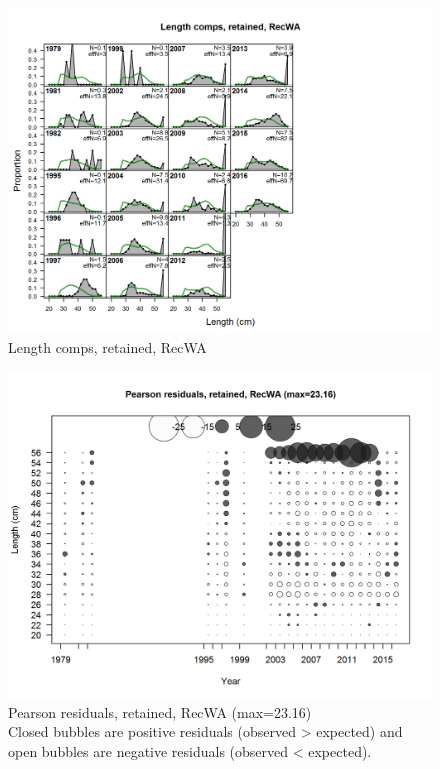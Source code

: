 \documentclass[12pt,]{article}
\begin{document}
\begin{figure}[htbp]
\centering
\includegraphics{./r4ss/plots_mod1/comp_lenfit_flt4mkt2.png}
\caption{Length comps, retained, RecWA
\label{fig:mod1_18_comp_lenfit_flt4mkt2}}
\end{figure}

\begin{figure}[htbp]
\centering
\includegraphics{./r4ss/plots_mod1/comp_lenfit_residsflt4mkt2.png}
\caption{Pearson residuals, retained, RecWA (max=23.16)\\
Closed bubbles are positive residuals (observed \textgreater{} expected)
and open bubbles are negative residuals (observed \textless{} expected).
\label{fig:mod1_19_comp_lenfit_residsflt4mkt2}}
\end{figure}
\end{document}

